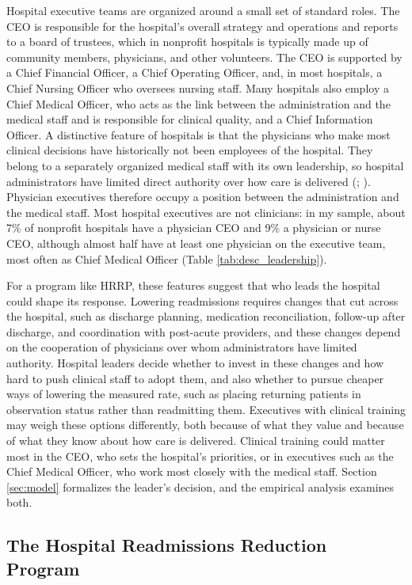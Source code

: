 \documentclass[12pt]{article}
\theoremstyle{definition}   %
\begin{document}
    Hospital executive teams are organized around a small set of standard roles. The CEO is responsible for the hospital's overall strategy and operations and reports to a board of trustees, which in nonprofit hospitals is typically made up of community members, physicians, and other volunteers. The CEO is supported by a Chief Financial Officer, a Chief Operating Officer, and, in most hospitals, a Chief Nursing Officer who oversees nursing staff. Many hospitals also employ a Chief Medical Officer, who acts as the link between the administration and the medical staff and is responsible for clinical quality, and a Chief Information Officer. A distinctive feature of hospitals is that the physicians who make most clinical decisions have historically not been employees of the hospital. They belong to a separately organized medical staff with its own leadership, so hospital administrators have limited direct authority over how care is delivered (\cite{harris1977internal}; \cite{pauly1973not}). Physician executives therefore occupy a position between the administration and the medical staff. Most hospital executives are not clinicians: in my sample, about 7\% of nonprofit hospitals have a physician CEO and 9\% a physician or nurse CEO, although almost half have at least one physician on the executive team, most often as Chief Medical Officer (Table \ref{tab:desc_leadership}).

    For a program like HRRP, these features suggest that who leads the hospital could shape its response. Lowering readmissions requires changes that cut across the hospital, such as discharge planning, medication reconciliation, follow-up after discharge, and coordination with post-acute providers, and these changes depend on the cooperation of physicians over whom administrators have limited authority. Hospital leaders decide whether to invest in these changes and how hard to push clinical staff to adopt them, and also whether to pursue cheaper ways of lowering the measured rate, such as placing returning patients in observation status rather than readmitting them. Executives with clinical training may weigh these options differently, both because of what they value and because of what they know about how care is delivered. Clinical training could matter most in the CEO, who sets the hospital's priorities, or in executives such as the Chief Medical Officer, who work most closely with the medical staff. Section \ref{sec:model} formalizes the leader's decision, and the empirical analysis examines both.

    \subsection{The Hospital Readmissions Reduction Program}
\end{document}
